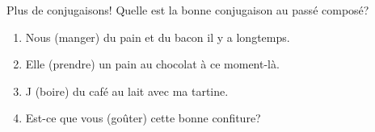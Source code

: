 \begin{frame}{Plus de conjugaisons!}
  Quelle est la bonne conjugaison au passé composé? \\
  \begin{enumerate}
    \item Nous \underline{} (manger) du pain et du bacon il y a longtemps.
    \item Elle \underline{} (prendre) un pain au chocolat à ce moment-là.
    \item J\underline{} (boire) du café au lait avec ma tartine.
    \item Est-ce que vous \underline{} (goûter) cette bonne confiture?
  \end{enumerate}
\end{frame}